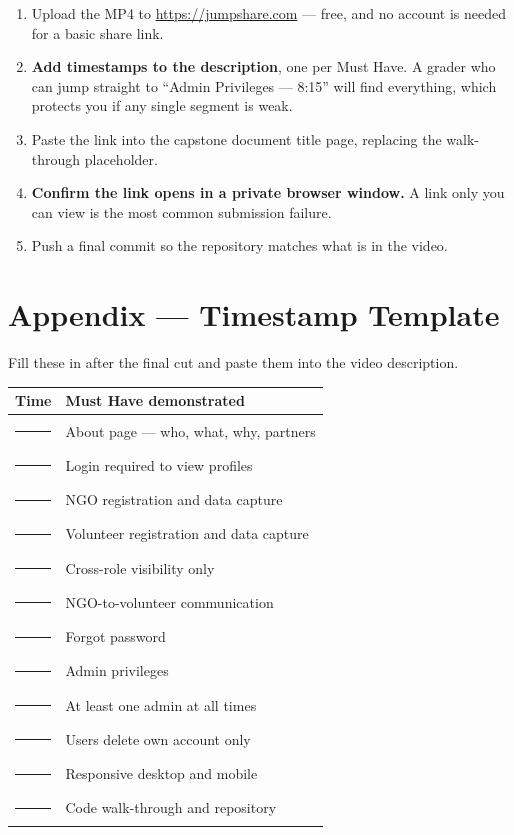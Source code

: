 \documentclass[11pt,letterpaper]{article}
\begin{document}
\begin{enumerate}
  \item Upload the MP4 to \url{https://jumpshare.com} --- free, and no
        account is needed for a basic share link.
  \item \textbf{Add timestamps to the description}, one per Must Have. A
        grader who can jump straight to ``Admin Privileges --- 8:15'' will
        find everything, which protects you if any single segment is weak.
  \item Paste the link into the capstone document title page, replacing the
        walk-through placeholder.
  \item \textbf{Confirm the link opens in a private browser window.} A link
        only you can view is the most common submission failure.
  \item Push a final commit so the repository matches what is in the video.
\end{enumerate}

\section*{Appendix --- Timestamp Template}

Fill these in after the final cut and paste them into the video description.

\begin{center}
\begin{tabularx}{\textwidth}{@{}L{2.2cm} X@{}}
\toprule
\textbf{Time} & \textbf{Must Have demonstrated}\\
\midrule
\rule{1.6cm}{0.4pt} & About page --- who, what, why, partners\\
\rule{1.6cm}{0.4pt} & Login required to view profiles\\
\rule{1.6cm}{0.4pt} & NGO registration and data capture\\
\rule{1.6cm}{0.4pt} & Volunteer registration and data capture\\
\rule{1.6cm}{0.4pt} & Cross-role visibility only\\
\rule{1.6cm}{0.4pt} & NGO-to-volunteer communication\\
\rule{1.6cm}{0.4pt} & Forgot password\\
\rule{1.6cm}{0.4pt} & Admin privileges\\
\rule{1.6cm}{0.4pt} & At least one admin at all times\\
\rule{1.6cm}{0.4pt} & Users delete own account only\\
\rule{1.6cm}{0.4pt} & Responsive desktop and mobile\\
\rule{1.6cm}{0.4pt} & Code walk-through and repository\\
\bottomrule
\end{tabularx}
\end{center}
\end{document}
